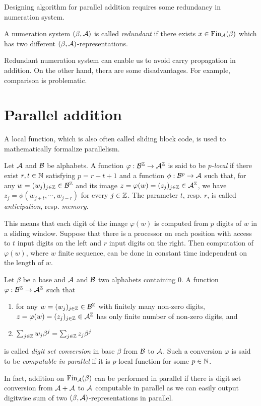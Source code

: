 Designing algorithm for parallel addition requires some redundancy in numeration system. 
\begin{defn}
A numeration system $(\beta,\mathcal{A})$ is called \emph{redundant} if there exists $x \in \text{Fin}_{\mathcal{A}}(\beta)$ which has two different $(\beta,\mathcal{A})$-representations.
\end{defn}
Redundant numeration system can enable us to avoid carry propagation in addition. On the other hand, thera are some disadvantages. For example, comparison is problematic.  


\section{Parallel addition}
A local function, which is also often called sliding block code, is used to mathematically formalize parallelism. 
\begin{defn}
Let $\mathcal{A}$ and $\mathcal{B}$ be alphabets. A function $\varphi:\mathcal{B}^{\mathbb{Z}} \rightarrow \mathcal{A}^{\mathbb{Z}}$ is said to be \emph{$p$-local} if there exist $r,t\in\mathbb{N}$ satisfying $p=r+t+1$ and a function $\phi: \mathcal{B}^p \rightarrow \mathcal{A}$ such that, for any $w=(w_j)_{j\in\mathbb{Z}}\in\mathcal{B}^{\mathbb{Z}}$ and its image $z=\varphi(w)=(z_j)_{j\in\mathbb{Z}}\in\mathcal{A}^{\mathbb{Z}}$, we have $z_j=\phi(w_{j+t},\cdots,w_{j-r})$ for every $j\in\mathbb{Z}$. The parameter $t$, resp. $r$, is called \emph{anticipation}, resp. \emph{memory}.
\end{defn}
This means that each digit of the image $\varphi(w)$ is computed from $p$ digits of $w$ in a sliding window. Suppose that there is a processor on  each position with access to $t$ input digits on the left and $r$ input digits on the right. Then computation of $\varphi(w)$, where $w$ finite sequence, can be done in constant time independent on the length of $w$.   
  
\begin{defn}
\label{def:digitSetConversion}
Let $\beta$ be a base and $\mathcal{A}$ and $\mathcal{B}$ two alphabets containing 0. A function $\varphi:\mathcal{B}^{\mathbb{Z}}\rightarrow \mathcal{A}^{\mathbb{Z}}$ such that
  \begin{enumerate}
      \item for any $w=(w_j)_{j\in\mathbb{Z}}\in\mathcal{B}^{\mathbb{Z}}$ with finitely many non-zero digits, $z=\varphi(w)=(z_j)_{j\in\mathbb{Z}}\in\mathcal{A}^{\mathbb{Z}}$ has only finite number of non-zero digits, and
      \item $\sum_{j\in\mathbb{Z}} w_j \beta^j= \sum_{j\in\mathbb{Z}} z_j \beta^j$
  \end{enumerate}
  is called \emph{digit set conversion} in base $\beta$ from $\mathcal{B}$ to $\mathcal{A}$. Such a conversion $\varphi$ is said to be \emph{computable in parallel} if it is $p$-local function for some $p\in\mathbb{N}$. 
\end{defn}
In fact, addition on $\text{Fin}_{\mathcal{A}}(\beta)$ can be performed in parallel if there is digit set conversion from $\mathcal{A}+\mathcal{A}$ to $\mathcal{A}$ computable in  parallel as we can easily output digitwise sum of two $(\beta,\mathcal{A})$-representations in parallel.   

